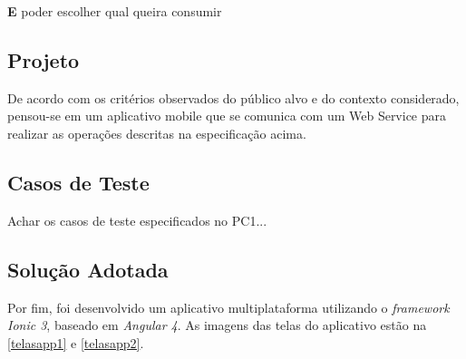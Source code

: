 \textbf{E} poder escolher qual queira consumir

\subsection{Projeto}

De acordo com os critérios observados do público alvo e do contexto considerado, pensou-se em um aplicativo mobile que se comunica com um Web Service para realizar as operações descritas na especificação acima.

\subsection{Casos de Teste}

Achar os casos de teste especificados no PC1...

\subsection{Solução Adotada}

Por fim, foi desenvolvido um aplicativo multiplataforma utilizando o \textit{framework Ionic 3}, baseado em \textit{Angular 4}. As imagens das telas do aplicativo estão na \ref{telasapp1} e \ref{telasapp2}.

